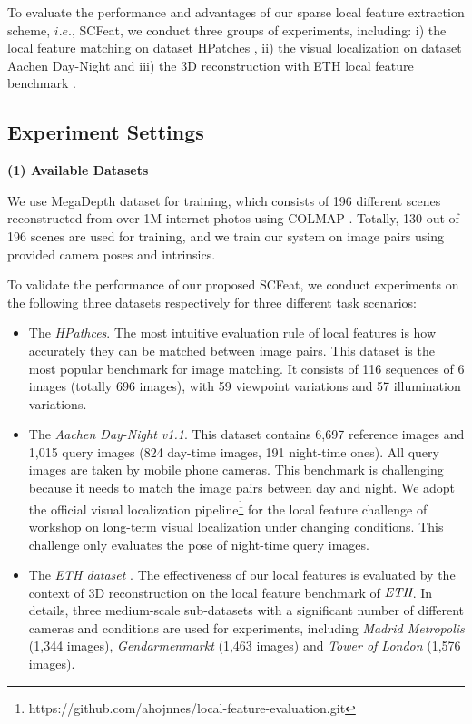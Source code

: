 \documentclass[journal]{IEEEtran}
\begin{document}
To evaluate the performance and advantages of our sparse local feature extraction scheme, $i.e.$, SCFeat, we conduct three groups of experiments, including: i) the local feature matching on dataset HPatches \cite{HPatches}, ii) the visual localization on dataset Aachen Day-Night \cite{aachen} and iii) the 3D reconstruction with ETH local feature benchmark \cite{ETH}.









\subsection{Experiment Settings}



\textbf{(1) Available Datasets}

We use MegaDepth dataset 
\cite{MegaDepthLi18} for training, which consists of 196 different scenes reconstructed from over 1M internet photos using COLMAP \cite{schoenberger2016sfm,schoenberger2016mvs}. Totally, 130 out of 196 scenes are used for training, and we train our system on image pairs using provided camera poses and intrinsics.  

To validate the performance of our proposed SCFeat, we conduct experiments on the following three datasets respectively for three different task scenarios:
\begin{itemize}
\item{
The \emph{HPathces}\cite{HPatches}.
The most intuitive evaluation rule of local features is how accurately they can be matched between image pairs. This dataset is the most popular benchmark for image matching. It consists of 116 sequences of 6 images (totally 696 images), with 59 viewpoint variations and 57 illumination variations. 
}
\item{
The \emph{Aachen Day-Night v1.1}\cite{aachen}.
This dataset contains 6,697 reference images and 1,015 query images (824 day-time images, 191 night-time ones). All query images are taken by mobile phone cameras. This benchmark is challenging because it needs to match the image pairs between day and night. We adopt the official visual localization pipeline\footnote{https://github.com/ahojnnes/local-feature-evaluation.git} for the local feature challenge of workshop on long-term visual localization under changing conditions. This challenge only evaluates the pose of night-time query images.
}
\item{
The \emph{ETH dataset }\cite{ETH}.
The effectiveness of our local features is evaluated by the context of 3D reconstruction on the local feature benchmark of $\emph{ETH}$. In details, three medium-scale sub-datasets with a significant number of different cameras and conditions are used for experiments, including \emph{Madrid Metropolis} (1,344 images), \emph{Gendarmenmarkt} (1,463 images) and \emph{Tower of London} (1,576 images).
}

\end{itemize}
\end{document}
